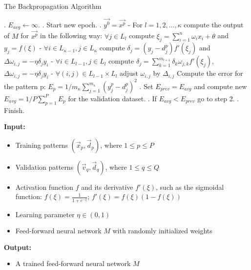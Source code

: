 \documentclass[a4paper]{report}
\begin{document}
{\begin{center}
\begin{algorithm}
\caption{The Backpropagation Algorithm}\label{alg:cap}
\begin{algorithmic}
. $E_{avg} \gets \infty$.
. Start new epoch.
. 
\State $\vec{y^0}=\vec{x^p}$
\State      - For $l=1, 2,\ldots,\kappa$ compute the output of $M$ for $\vec{x^p}$ in the following way:
\State $\forall j\in L_l$ compute $\xi_j=\sum_{i=1}^n\omega_ix_i+\theta$ and $y_j=f(\xi)$
\State      - $\forall i\in L_{\kappa-1},j\in L_\kappa$ compute $\delta_j=(y_j-d_j^p)f'(\xi_j)$ and $\Delta\omega_{i,j}= -\eta\delta_j y_i$
\State - $\forall i\in L_{l-1},j\in L_l$ compute $\delta_j=\sum_{k=1}^{m_{l+1}}\delta_k\omega_{j,k}f'(\xi_j),$ $\Delta\omega_{i,j}=-\eta\delta_j y_i$
\EndFor
{} \State - $\forall (i,j)\in L_{l-1}\times L_l$ adjust $\omega_{i,j}$ by $\Delta_{i,j}$
\EndFor
\State Compute the error for the pattern p: $E_p=1/m_\kappa \sum_{j=1}^{m_\kappa}(y_j^p-d_j^p)^2$
\EndIf
\EndFor
{}. Set $E_{prev}=E_{avg}$ and compute new $E_{avg}=1/P\sum_{p=1}^PE_p$ for the validation dataset.
. If $E_{avg} < E_{prev}$ go to step 2.
. Finish.
\EndProcedure
\end{algorithmic}
\end{algorithm}
\end{center}
\textbf{Input:}
\begin{itemize}
    \item Training patterns $(\vec{x}_p, \vec{d}_p)$, where $1 \leq p \leq P$
    \item Validation patterns $(\vec{v}_q, \vec{d}_q)$, where $1 \leq q \leq Q$
    \item Activation function $f$ and its derivative $f'(\xi)$, such as the sigmoidal function: $f(\xi) = \frac{1}{1 + e^{-\xi}}$; $f'(\xi) = f(\xi)(1 - f(\xi))$
    \item Learning parameter $\eta \in (0, 1)$
    \item Feed-forward neural network $M$ with randomly initialized weights
\end{itemize}

\textbf{Output:}
\begin{itemize}
    \item A trained feed-forward neural network $M$
\end{itemize}
}
\end{document}

